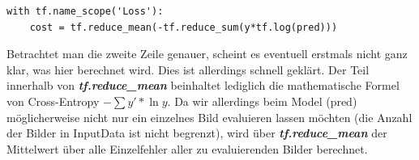 \begin{lstlisting}
with tf.name_scope('Loss'):
	cost = tf.reduce_mean(-tf.reduce_sum(y*tf.log(pred)))
\end{lstlisting}


	
	
Betrachtet man die zweite Zeile genauer, scheint es eventuell erstmals nicht ganz klar, was hier berechnet wird. Dies ist allerdings schnell geklärt. Der Teil innerhalb von \textbf{\textit{tf.reduce\_mean}} beinhaltet lediglich die mathematische Formel von Cross-Entropy $ - \sum{y' * \ln{y}}$. Da wir allerdings beim Model (pred) möglicherweise nicht nur ein einzelnes Bild evaluieren lassen möchten (die Anzahl der Bilder in InputData ist nicht begrenzt), wird über \textbf{\textit{tf.reduce\_mean}} der Mittelwert über alle Einzelfehler aller zu evaluierenden Bilder berechnet.


\label{cha:Bewertungsschema}